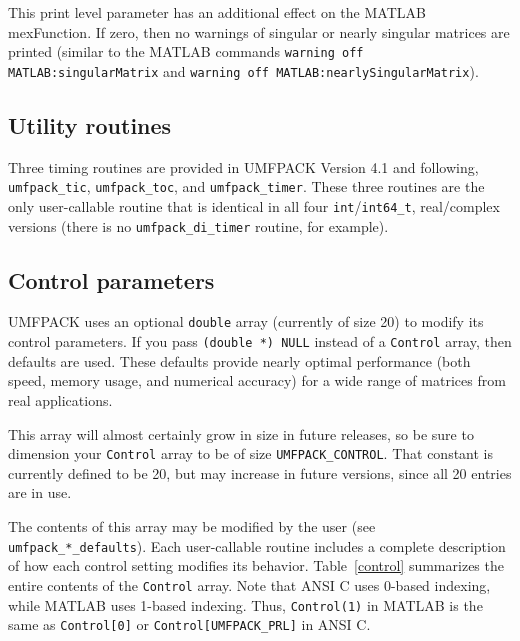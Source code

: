 \documentclass[11pt]{article}
\begin{document}
This print level parameter has an additional effect on the MATLAB mexFunction.
If zero, then no warnings of singular or nearly singular matrices are
printed (similar to the MATLAB commands
{\tt warning off MATLAB:singularMatrix} and
{\tt warning off MATLAB:nearlySingularMatrix}).

\subsection{Utility routines}

Three timing routines are provided in UMFPACK Version 4.1 and following,
{\tt umfpack\_tic}, {\tt umfpack\_toc}, and {\tt umfpack\_timer}.
These three routines are the only user-callable
routine that is identical in all four {\tt int}/\verb'int64_t', real/complex
versions (there is no {\tt umfpack\_di\_timer} routine, for example).

\subsection{Control parameters}
\label{control_param}

UMFPACK uses an optional {\tt double} array (currently of size 20)
to modify its control parameters.  If you pass {\tt (double *) NULL} instead
of a {\tt Control} array, then defaults are used.  These defaults provide
nearly optimal performance (both speed, memory usage, and numerical accuracy)
for a wide range of matrices from real applications.

This array will almost certainly grow in size in future releases,
so be sure to dimension your {\tt Control} array to be of size
{\tt UMFPACK\_CONTROL}.  That constant is currently defined to be 20,
but may increase in future versions, since all 20 entries are in use.

The contents of this array may be modified by the user
(see {\tt umfpack\_*\_defaults}).  Each
user-callable routine includes a complete description of how each control
setting modifies its behavior.  Table~\ref{control} summarizes the entire
contents of the {\tt Control} array.
Note that ANSI C uses 0-based indexing, while MATLAB uses 1-based
indexing.  Thus, {\tt Control(1)} in MATLAB is the same as
{\tt Control[0]} or {\tt Control[UMFPACK\_PRL]} in ANSI C.
\end{document}
